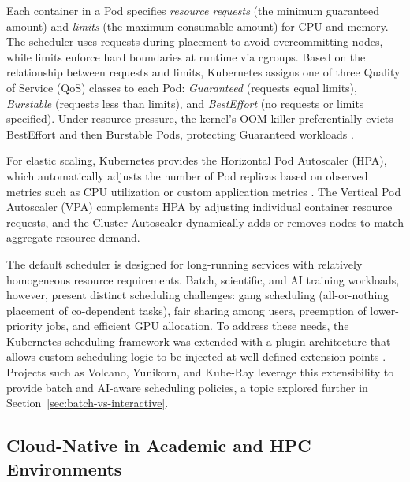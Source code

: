 Each container in a Pod specifies \emph{resource requests} (the minimum guaranteed amount) and \emph{limits} (the maximum consumable amount) for CPU and memory. The scheduler uses requests during placement to avoid overcommitting nodes, while limits enforce hard boundaries at runtime via cgroups. Based on the relationship between requests and limits, Kubernetes assigns one of three Quality of Service (QoS) classes to each Pod: \emph{Guaranteed} (requests equal limits), \emph{Burstable} (requests less than limits), and \emph{BestEffort} (no requests or limits specified). Under resource pressure, the kernel's OOM killer preferentially evicts BestEffort and then Burstable Pods, protecting Guaranteed workloads \citep{senjab2023survey}.

For elastic scaling, Kubernetes provides the Horizontal Pod Autoscaler (HPA), which automatically adjusts the number of Pod replicas based on observed metrics such as CPU utilization or custom application metrics \citep{nguyen2020hpa}. The Vertical Pod Autoscaler (VPA) complements HPA by adjusting individual container resource requests, and the Cluster Autoscaler dynamically adds or removes nodes to match aggregate resource demand.


The default scheduler is designed for long-running services with relatively homogeneous resource requirements. Batch, scientific, and AI training workloads, however, present distinct scheduling challenges: gang scheduling (all-or-nothing placement of co-dependent tasks), fair sharing among users, preemption of lower-priority jobs, and efficient GPU allocation. To address these needs, the Kubernetes scheduling framework was extended with a plugin architecture that allows custom scheduling logic to be injected at well-defined extension points \citep{misale2022standard}. Projects such as Volcano, Yunikorn, and Kube-Ray leverage this extensibility to provide batch and AI-aware scheduling policies, a topic explored further in Section~\ref{sec:batch-vs-interactive}.


\subsection{Cloud-Native in Academic and HPC Environments}

